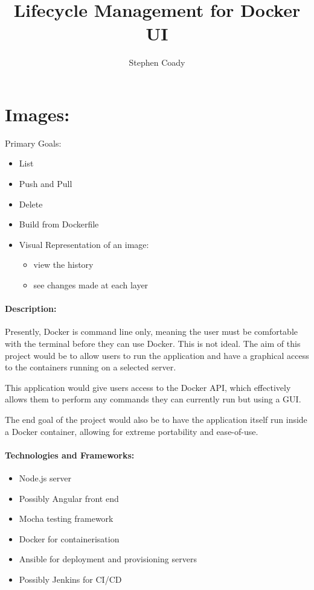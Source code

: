 \documentclass{article}
\author{Stephen Coady}
\title{Lifecycle Management for Docker UI}
\begin{document}
\maketitle
\newpage

\section{Images:}
Primary Goals: 
\begin{itemize}
	\item List
	\item Push and Pull
	\item Delete
	\item Build from Dockerfile
	\item Visual Representation of an image: 
	\begin{itemize}
		\item view the history
		\item see changes made at each layer
	\end{itemize}
\end{itemize}



\paragraph{Description:}
\label{par:Description}
Presently, Docker is command line only, meaning the user must be comfortable with the terminal before they can use Docker. This is not ideal. The aim of this project would be to allow users to run the application and have a graphical access to the containers running on a selected server.

This application would give users access to the Docker API, which effectively allows them to perform any commands they can currently run but using a GUI.

The end goal of the project would also be to have the application itself run inside a Docker container, allowing for extreme portability and ease-of-use.

\paragraph{Technologies and Frameworks:}
\label{par:Technologies and Frameworks}
\begin{itemize}
	\item Node.js server
	\item Possibly Angular front end
	\item Mocha testing framework
  \item Docker for containerisation
  \item Ansible for deployment and provisioning servers
  \item Possibly Jenkins for CI/CD
\end{itemize}
\end{document}
